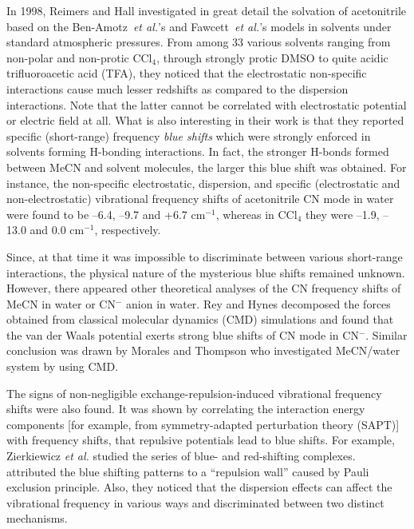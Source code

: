 \documentclass[b5paper,oneside,fleqn,11pt]{book}
\begin{document}
\begin{refsection}
In 1998, Reimers and Hall \citep{Reimers.Hall.JACS.1999} investigated in great detail the solvation of acetonitrile 
based on the Ben-Amotz~\emph{et al.}'s and Fawcett~\emph{et al.}'s models in solvents under standard atmospheric pressures. 
From among 33 various solvents ranging from non\hyp{}polar and non\hyp{}protic CCl$_4$, 
through strongly protic
DMSO to quite acidic trifluoroacetic acid (TFA), they noticed that the electrostatic
non\hyp{}specific interactions cause much lesser redshifts as compared to the dispersion
interactions. Note that the latter cannot be correlated with electrostatic potential
or electric field at all. What is also interesting in their work is that they 
reported specific (short\hyp{}range) frequency \emph{blue shifts} which were strongly enforced
in solvents forming H-bonding interactions. In fact, the stronger H-bonds formed between MeCN
and solvent molecules, the larger this blue shift was obtained. For instance,
the non\hyp{}specific electrostatic, dispersion, and specific (electrostatic
and non\hyp{}electrostatic) vibrational frequency shifts of acetonitrile CN mode
in water were found to be --6.4, --9.7 and +6.7 cm$^{-1}$, whereas in CCl$_4$ they were
--1.9, --13.0 and 0.0 cm$^{-1}$, respectively.

Since, at that time it was impossible to discriminate between various short\hyp{}range
interactions, the physical nature of the mysterious blue shifts remained unknown.
However, there appeared other theoretical analyses of the CN frequency shifts of MeCN in water
or CN$^-$ anion in water. Rey and Hynes \citep{Rey.Hynes.JCP.1998} decomposed the forces obtained from classical molecular dynamics
(CMD) simulations and found that the van der Waals potential exerts strong blue shifts of CN mode in CN$^-$.
Similar conclusion was drawn by Morales and Thompson who investigated MeCN/water system by 
using CMD. \citep{Morales.Thompson.JPCB.2011}

The signs of non\hyp{}negligible exchange\hyp{}repulsion\hyp{}induced vibrational 
frequency \newline shifts were also  
found. \citep{Li.Liu.Schlegel.JACS.2002,Delanoye.Herrebout.vanderVeken.JACS.2002,Zierkiewicz.Jurecka.Hobza.ChemPhysChem.2005,
Rodziewicz.Rutkowski.Melikova.Koll.ChemPhysChem.2005,
Zhou.Qiu.JPCA.2009,Mo.Wang.Guan.Braida.Hiberty.Wu.ChemEurJ.2014}
It was shown by correlating the interaction
energy components [for example, from symmetry\hyp{}adapted 
perturbation theory \citep{Jeziorski.Moszynski.Szalewicz.ChemRev.1994} (SAPT)] with frequency shifts, that repulsive potentials
lead to blue shifts. For example, Zierkiewicz \emph{et al.} studied the series of 
blue\hyp{} and red\hyp{}shifting complexes. \citep{Zierkiewicz.Jurecka.Hobza.ChemPhysChem.2005} 
attributed the
blue shifting patterns to a ``repulsion wall'' caused by Pauli exclusion principle. 
Also, they noticed that
the dispersion effects can affect the vibrational frequency in various ways
and discriminated between two distinct mechanisms.


\end{refsection}
\end{document}
